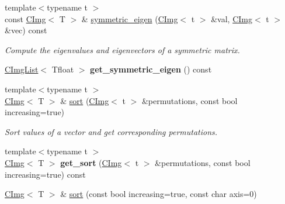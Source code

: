 \begin{DoxyCompactItemize}
\item 
\hypertarget{structcimg__library_1_1CImg_afddd851f2413d27929b21f9492f3bfbe}{
{\footnotesize template$<$typename t $>$ }\\const \hyperlink{structcimg__library_1_1CImg}{CImg}$<$ T $>$ \& \hyperlink{structcimg__library_1_1CImg_afddd851f2413d27929b21f9492f3bfbe}{symmetric\_\-eigen} (\hyperlink{structcimg__library_1_1CImg}{CImg}$<$ t $>$ \&val, \hyperlink{structcimg__library_1_1CImg}{CImg}$<$ t $>$ \&vec) const }
\label{structcimg__library_1_1CImg_afddd851f2413d27929b21f9492f3bfbe}

\begin{DoxyCompactList}\small\item\em Compute the eigenvalues and eigenvectors of a symmetric matrix. \item\end{DoxyCompactList}\item 
\hypertarget{structcimg__library_1_1CImg_af970d1443e880c4d5668e2b752c5fbae}{
\hyperlink{structcimg__library_1_1CImgList}{CImgList}$<$ Tfloat $>$ {\bfseries get\_\-symmetric\_\-eigen} () const }
\label{structcimg__library_1_1CImg_af970d1443e880c4d5668e2b752c5fbae}

\item 
\hypertarget{structcimg__library_1_1CImg_a44ae8948547aa53345e5dcda7e6b7dc7}{
{\footnotesize template$<$typename t $>$ }\\\hyperlink{structcimg__library_1_1CImg}{CImg}$<$ T $>$ \& \hyperlink{structcimg__library_1_1CImg_a44ae8948547aa53345e5dcda7e6b7dc7}{sort} (\hyperlink{structcimg__library_1_1CImg}{CImg}$<$ t $>$ \&permutations, const bool increasing=true)}
\label{structcimg__library_1_1CImg_a44ae8948547aa53345e5dcda7e6b7dc7}

\begin{DoxyCompactList}\small\item\em Sort values of a vector and get corresponding permutations. \item\end{DoxyCompactList}\item 
\hypertarget{structcimg__library_1_1CImg_a654dfeac2269456e9941103a43479f59}{
{\footnotesize template$<$typename t $>$ }\\\hyperlink{structcimg__library_1_1CImg}{CImg}$<$ T $>$ {\bfseries get\_\-sort} (\hyperlink{structcimg__library_1_1CImg}{CImg}$<$ t $>$ \&permutations, const bool increasing=true) const }
\label{structcimg__library_1_1CImg_a654dfeac2269456e9941103a43479f59}

\item 
\hypertarget{structcimg__library_1_1CImg_ae389f8738e1fd745853ac0507bf5800f}{
\hyperlink{structcimg__library_1_1CImg}{CImg}$<$ T $>$ \& \hyperlink{structcimg__library_1_1CImg_ae389f8738e1fd745853ac0507bf5800f}{sort} (const bool increasing=true, const char axis=0)}
\label{structcimg__library_1_1CImg_ae389f8738e1fd745853ac0507bf5800f}


\end{DoxyCompactItemize}
